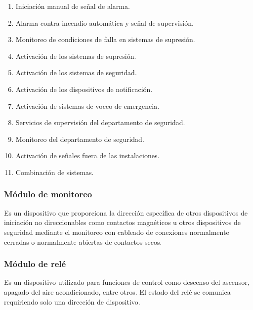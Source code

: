\begin{enumerate}
	
	\item Iniciación manual de señal de alarma.
	
	\item Alarma contra incendio automática y señal de supervisión.
	
	\item Monitoreo de condiciones de falla en sistemas de supresión.
	
	\item Activación de los sistemas de supresión.
	
	\item Activación de los sistemas de seguridad.
	
	\item Activación de los dispositivos de notificación.
	
	\item Activación de sistemas de voceo de emergencia.
	
	\item Servicios de supervisión del departamento de seguridad.
	
	\item Monitoreo del departamento de seguridad.
	
	\item Activación de señales fuera de las instalaciones.
	
	\item Combinación de sistemas.
	
\end{enumerate}

 
\subsubsection{Módulo de monitoreo}

Es un dispositivo que proporciona la dirección específica de otros dispositivos de iniciación no direccionables como contactos magnéticos u otros dispositivos de seguridad mediante el monitoreo con cableado de conexiones normalmente cerradas o normalmente abiertas de contactos secos.\cite{Monitoreo}


\subsubsection{Módulo de relé}

Es un dispositivo utilizado para funciones de control como descenso del ascensor, apagado del aire acondicionado, entre otros. El estado del relé se comunica requiriendo solo una dirección de dispositivo.\cite{Rele}

